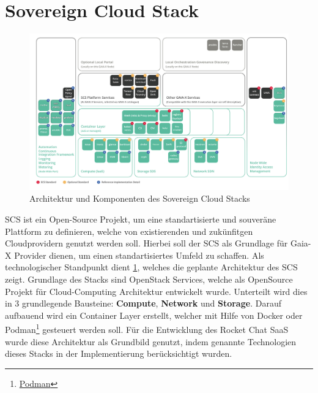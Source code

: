 \section{Sovereign Cloud Stack}
\label{sec:gaia-x:scs}

\begin{figure}[h]
  \centering
  \includegraphics[height=0.71\textwidth]{gfx/chapters/4_gaia-X/scs_architecture.png}
  \caption{Architektur und Komponenten des Sovereign Cloud Stacks}
  \label{fig:scs_architecture}
\end{figure}

\ac{SCS} ist ein Open-Source Projekt, um eine standartisierte und souveräne Plattform zu definieren, welche von 
existierenden und zukünfitgen Cloudprovidern genutzt werden soll. Hierbei soll der \ac{SCS} als Grundlage für Gaia-X Provider
dienen, um einen standartisiertes Umfeld zu schaffen.
Als technologischer Standpunkt dient \ref{fig:scs_architecture}, welches die geplante Architektur des \ac{SCS} zeigt. 
Grundlage des Stacks sind OpenStack Services, welche als OpenSource Projekt für Cloud-Computing Architektur entwickelt wurde.
Unterteilt wird dies in 3 grundlegende Bausteine: \textbf{Compute}, \textbf{Network} und \textbf{Storage}. Darauf aufbauend
wird ein Container Layer erstellt, welcher mit Hilfe von Docker oder Podman\footnote{\href{https://podman.io}{Podman}} gesteuert werden soll. \cite{scs}
Für die Entwicklung des Rocket Chat \ac{SaaS} wurde diese Architektur als Grundbild genutzt, indem 
genannte Technologien dieses Stacks in der Implementierung berücksichtigt wurden.